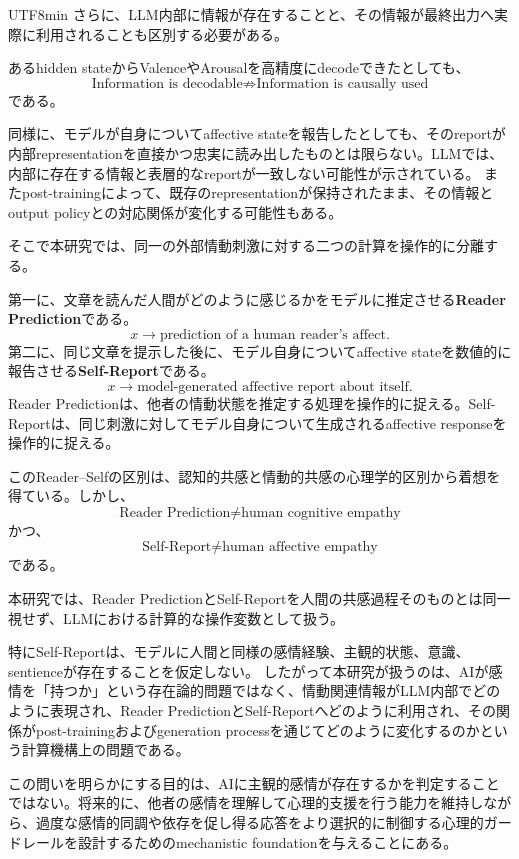 \documentclass{article} %
\begin{document}
\begin{CJK*}{UTF8}{min}
さらに、LLM内部に情報が存在することと、その情報が最終出力へ実際に利用されることも区別する必要がある。

あるhidden stateからValenceやArousalを高精度にdecodeできたとしても、
\[
\text{Information is decodable}
\not\Rightarrow
\text{Information is causally used}
\]
である。

同様に、モデルが自身についてaffective stateを報告したとしても、そのreportが内部representationを直接かつ忠実に読み出したものとは限らない。LLMでは、内部に存在する情報と表層的なreportが一致しない可能性が示されている\citep{burns2022discovering,turpin2023language}。
またpost-trainingによって、既存のrepresentationが保持されたまま、その情報とoutput policyとの対応関係が変化する可能性もある\citep{sharma2024towards,ferrando2025know}。

そこで本研究では、同一の外部情動刺激に対する二つの計算を操作的に分離する。

第一に、文章を読んだ人間がどのように感じるかをモデルに推定させる\textbf{Reader Prediction}である。
\[
x
\rightarrow
\text{prediction of a human reader's affect}.
\]
第二に、同じ文章を提示した後に、モデル自身についてaffective stateを数値的に報告させる\textbf{Self-Report}である。
\[
x
\rightarrow
\text{model-generated affective report about itself}.
\]
Reader Predictionは、他者の情動状態を推定する処理を操作的に捉える。Self-Reportは、同じ刺激に対してモデル自身について生成されるaffective responseを操作的に捉える。

このReader--Selfの区別は、認知的共感と情動的共感の心理学的区別から着想を得ている。しかし、
\[
\text{Reader Prediction}
\neq
\text{human cognitive empathy}
\]
かつ、
\[
\text{Self-Report}
\neq
\text{human affective empathy}
\]
である。

本研究では、Reader PredictionとSelf-Reportを人間の共感過程そのものとは同一視せず、LLMにおける計算的な操作変数として扱う。

特にSelf-Reportは、モデルに人間と同様の感情経験、主観的状態、意識、sentienceが存在することを仮定しない。
したがって本研究が扱うのは、AIが感情を「持つか」という存在論的問題ではなく、情動関連情報がLLM内部でどのように表現され、Reader PredictionとSelf-Reportへどのように利用され、その関係がpost-trainingおよびgeneration processを通じてどのように変化するのかという計算機構上の問題である。

この問いを明らかにする目的は、AIに主観的感情が存在するかを判定することではない。将来的に、他者の感情を理解して心理的支援を行う能力を維持しながら、過度な感情的同調や依存を促し得る応答をより選択的に制御する心理的ガードレールを設計するためのmechanistic foundationを与えることにある。


\end{CJK*}
\end{document}

